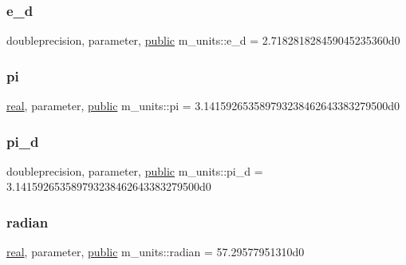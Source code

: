 \mbox{\label{namespacem__units_a758f857fe2277b6576ffae5654544405}} 
\subsubsection{\texorpdfstring{e\+\_\+d}{e\_d}}
{\footnotesize\ttfamily doubleprecision, parameter, \hyperlink{M__stopwatch_83_8txt_a2f74811300c361e53b430611a7d1769f}{public} m\+\_\+units\+::e\+\_\+d = 2.\+718281828459045235360d0}

\mbox{\label{namespacem__units_a7f9e69ec2fe4e5a5c49f7dce15a48a67}} 
\subsubsection{\texorpdfstring{pi}{pi}}
{\footnotesize\ttfamily \hyperlink{read__watch_83_8txt_abdb62bde002f38ef75f810d3a905a823}{real}, parameter, \hyperlink{M__stopwatch_83_8txt_a2f74811300c361e53b430611a7d1769f}{public} m\+\_\+units\+::pi = 3.\+141592653589793238462643383279500d0}

\mbox{\label{namespacem__units_a4c458c5da447708cb6e03ec4c3469dcd}} 
\subsubsection{\texorpdfstring{pi\+\_\+d}{pi\_d}}
{\footnotesize\ttfamily doubleprecision, parameter, \hyperlink{M__stopwatch_83_8txt_a2f74811300c361e53b430611a7d1769f}{public} m\+\_\+units\+::pi\+\_\+d = 3.\+141592653589793238462643383279500d0}

\mbox{\label{namespacem__units_ae9442f0901c0238170aff7cf946fb0c1}} 
\subsubsection{\texorpdfstring{radian}{radian}}
{\footnotesize\ttfamily \hyperlink{read__watch_83_8txt_abdb62bde002f38ef75f810d3a905a823}{real}, parameter, \hyperlink{M__stopwatch_83_8txt_a2f74811300c361e53b430611a7d1769f}{public} m\+\_\+units\+::radian = 57.\+29577951310d0}

